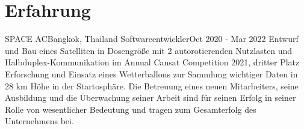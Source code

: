 \section{Erfahrung}
\resumeSubHeadingListStart

\resumeSubheading
{SPACE AC}{Bangkok, Thailand}
{Softwareentwickler}{Oct 2020 - Mar 2022}
\resumeItemListStart
{}
{Entwurf und Bau eines Satelliten in Dosengröße mit 2 autorotierenden Nutzlasten und Halbduplex-Kommunikation im Annual Cansat Competition 2021, dritter Platz}
{Erforschung und Einsatz eines Wetterballons zur Sammlung wichtiger Daten in 28 km Höhe in der Startosphäre.}
{Die Betreuung eines neuen Mitarbeiters, seine Ausbildung und die Überwachung seiner Arbeit sind für seinen Erfolg in seiner Rolle von wesentlicher Bedeutung und tragen zum Gesamterfolg des Unternehmens bei.}
\resumeItemListEnd



\resumeSubHeadingListEnd

